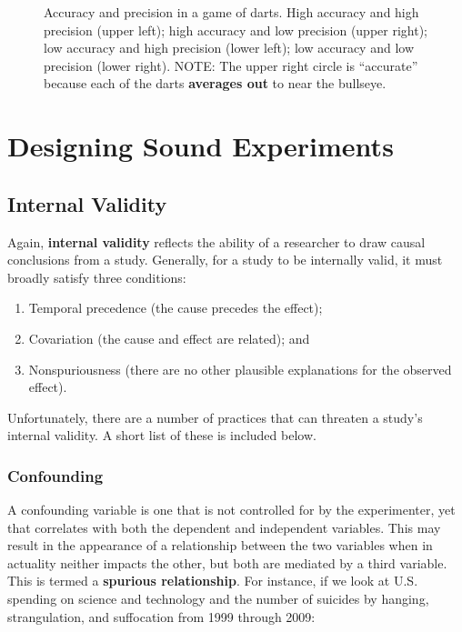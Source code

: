\begin{figure}
\caption{Accuracy and precision in a game of darts. High accuracy and high precision (upper left); high accuracy and low precision (upper right); low accuracy and high precision (lower left); low accuracy and low precision (lower right). NOTE: The upper right circle is ``accurate'' because each of the darts \textbf{averages out} to near the bullseye.}
\label{fig:research01}
\end{figure}

\section{Designing Sound Experiments}

\subsection{Internal Validity}
Again, \textbf{internal validity} reflects the ability of a researcher to draw causal conclusions from a study. Generally, for a study to be internally valid, it must broadly satisfy three conditions:

\begin{enumerate}
  \item Temporal precedence (the cause precedes the effect);
  \item Covariation (the cause and effect are related); and
  \item Nonspuriousness (there are no other plausible explanations for the observed effect).
\end{enumerate}

Unfortunately, there are a number of practices that can threaten a study's internal validity. A short list of these is included below.

\subsubsection{Confounding}
A confounding variable is one that is not controlled for by the experimenter, yet that correlates with both the dependent and independent variables. This may result in the appearance of a relationship between the two variables when in actuality neither impacts the other, but both are mediated by a third variable. This is termed a \textbf{spurious relationship}. For instance, if we look at U.S. spending on science and technology and the number of suicides by hanging, strangulation, and suffocation from 1999 through 2009:


